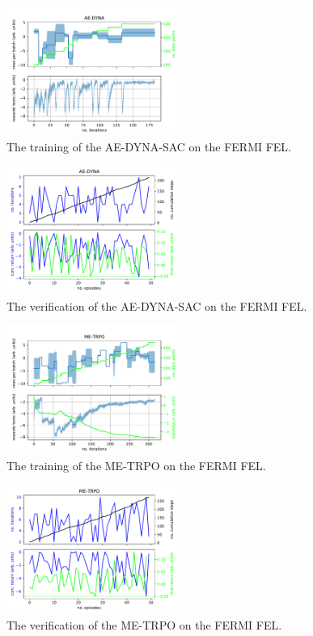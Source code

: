 \documentclass[
 reprint,
 amsmath,amssymb,amsfonts,clevref,
 aps,
prstab,
]{revtex4-2}
\begin{document}
\begin{figure}[!h]
	\centering
	\includegraphics*[width=0.5\textwidth]{Figures/AE-DYNA_observables.pdf}
	\caption{The training of the AE-DYNA-SAC on the FERMI FEL.}
	\label{fig:AE-DYNA_observables}
\end{figure}

\begin{figure}[!h]
	\centering
	\includegraphics*[width=0.5\textwidth]{Figures/AE-DYNA_verification.pdf}
	\caption{The verification of the AE-DYNA-SAC on the FERMI FEL.}
	\label{fig:AE-DYNA_verification}
\end{figure}


\begin{figure}[!h]
	\centering
	\includegraphics*[width=0.5\textwidth]{Figures/ME-TRPO_observables.pdf}
	\caption{The training of the ME-TRPO on the FERMI FEL.}
	\label{fig:ME-TRPO_observables}
\end{figure}
\begin{figure}[!h]
	\centering
	\includegraphics*[width=0.5\textwidth]{Figures/ME-TRPO_verification.pdf}
	\caption{The verification of the ME-TRPO on the FERMI FEL.}
	\label{fig:ME-TRPO_verification}
\end{figure}
\end{document}
